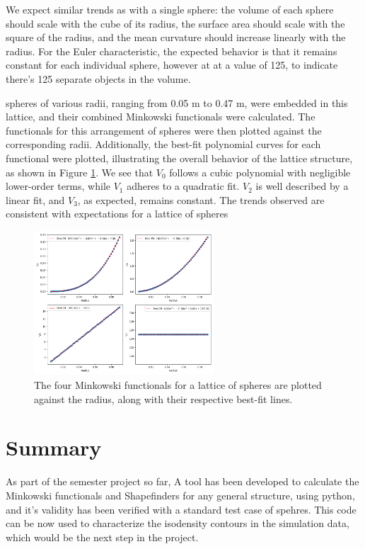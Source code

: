 \documentclass{article}
\begin{document}
We expect similar trends as with a single sphere: the volume of each sphere should scale with the cube of its radius, the surface area should scale with the square of the radius, and the mean curvature should increase linearly with the radius. For the Euler characteristic, the expected behavior is that it remains constant for each individual sphere, however at at a value of 125, to indicate there's 125 separate objects in the volume.

spheres of various radii, ranging from 0.05 m to 0.47 m, were embedded in this lattice, and their combined Minkowski functionals were calculated. The functionals for this arrangement of spheres were then plotted against the corresponding radii. Additionally, the best-fit polynomial curves for each functional were plotted, illustrating the overall behavior of the lattice structure, as shown in Figure \ref{fig:lattice_spheres_plot}. We see that $V_0$ follows a cubic polynomial with negligible lower-order terms, while $V_1$ adheres to a quadratic fit. $V_2$ is well described by a linear fit, and $V_3$, as expected, remains constant. The trends observed are consistent with expectations for a lattice of spheres

\begin{figure}[h!] 
    \centering 
    \includegraphics[width=0.6\textwidth]{Images/grid_radius_variance.png} 
    \caption{The four Minkowski functionals for a lattice of spheres are plotted against the radius, along with their respective best-fit lines.} 
    \label{fig:lattice_spheres_plot} 
\end{figure}





\section{Summary}

As part of the semester project so far, A tool has been developed to calculate the Minkowski functionals and Shapefinders for any general structure, using python, and it's validity has been verified with a standard test case of spehres. This code can be now used to characterize the isodensity contours in the simulation data, which would be the next step in the project. 


\end{document}
